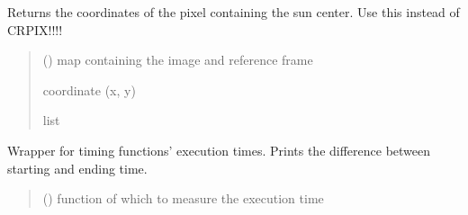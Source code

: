 \documentclass[letterpaper,10pt,english]{sphinxmanual}
\begin{document}

\begin{fulllineitems}
\label{\detokenize{doppler_dimming_lib:doppler_dimming_lib.utils.get_sun_center_from_map}}
\pysigstartsignatures
{}
\pysigstopsignatures
\sphinxAtStartPar
Returns the coordinates of the pixel containing the sun center. Use this instead of CRPIX!!!!
\begin{quote}\begin{description}
\sphinxAtStartPar
{} () \textendash{} map containing the image and reference frame

\sphinxAtStartPar
coordinate (x, y)

\sphinxAtStartPar
list

\end{description}\end{quote}

\end{fulllineitems}


\begin{fulllineitems}
\label{\detokenize{doppler_dimming_lib:doppler_dimming_lib.utils.timeit}}
\pysigstartsignatures
{}
\pysigstopsignatures
\sphinxAtStartPar
Wrapper for timing functions’ execution times. Prints the difference between starting and ending time.
\begin{quote}\begin{description}
\sphinxAtStartPar
{} () \textendash{} function of which to measure the execution time

\end{description}\end{quote}

\end{fulllineitems}
\end{document}
